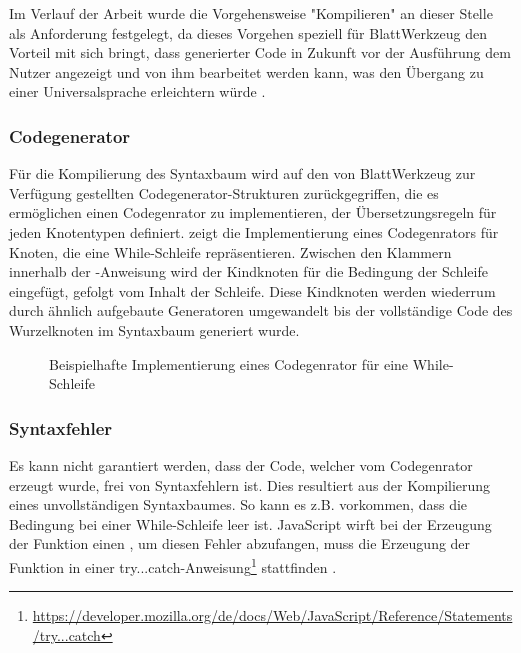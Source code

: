 Im Verlauf der Arbeit wurde die Vorgehensweise "Kompilieren" an dieser Stelle als Anforderung festgelegt, da dieses Vorgehen speziell für BlattWerkzeug den Vorteil mit sich bringt, dass generierter Code in Zukunft vor der Ausführung dem Nutzer angezeigt und von ihm bearbeitet werden kann, was den Übergang zu einer Universalsprache erleichtern würde .

\subsubsection{Codegenerator}

Für die Kompilierung des Syntaxbaum wird auf den von BlattWerkzeug zur Verfügung gestellten Codegenerator-Strukturen zurückgegriffen, die es ermöglichen einen Codegenrator zu implementieren, der Übersetzungsregeln für jeden Knotentypen definiert.  zeigt die Implementierung eines Codegenrators für Knoten, die eine While-Schleife repräsentieren. Zwischen den Klammern innerhalb der -Anweisung wird der Kindknoten für die Bedingung der Schleife eingefügt, gefolgt vom Inhalt der Schleife. Diese Kindknoten werden wiederrum durch ähnlich aufgebaute Generatoren umgewandelt bis der vollständige Code des Wurzelknoten im Syntaxbaum generiert wurde.

\begin{figure}
  
  \caption{Beispielhafte Implementierung eines Codegenrator für eine While-Schleife}
  \label{fig:implementation:program:evaluation:while}
\end{figure}

\subsubsection{Syntaxfehler}

Es kann nicht garantiert werden, dass der Code, welcher vom Codegenrator erzeugt wurde, frei von Syntaxfehlern ist. Dies resultiert aus der Kompilierung eines unvollständigen Syntaxbaumes. So kann es z.B. vorkommen, dass die Bedingung bei einer While-Schleife leer ist. JavaScript wirft bei der Erzeugung der Funktion einen , um diesen Fehler abzufangen, muss die Erzeugung der Funktion in einer try...catch-Anweisung\footnote{\url{https://developer.mozilla.org/de/docs/Web/JavaScript/Reference/Statements/try...catch}} stattfinden .

